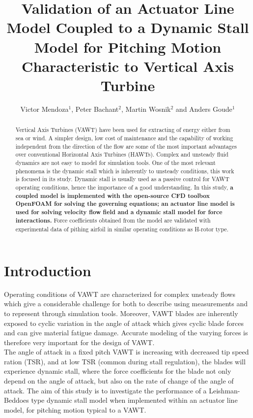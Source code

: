 \documentclass[a4paper]{jpconf}
\begin{document}
\title{Validation of an Actuator Line Model Coupled to a Dynamic Stall Model for Pitching Motion Characteristic to Vertical Axis Turbine} %
\author{Victor Mendoza$^{1}$, Peter Bachant$^{2}$, Martin Wosnik$^{2}$ and Anders Goude$^{1}$ }
\address{$^{1}$ Department of Engineering Sciences, Division of Electricity, Uppsala University, \\Uppsala 751 21, Sweden}
\address{$^{2}$ Center for Ocean Renewable Energy, University of New Hampshire, 24 Colovos Rd.,\\ Durham, NH 03824, USA}




\begin{abstract}

    Vertical Axis Turbines (VAWT) have been used for extracting of energy either
    from sea or wind. A simpler design, low cost of maintenance and the
    capability of working independent from the direction of the flow are some of
    the most important advantages over conventional Horizontal Axis Turbines
    (HAWTs). Complex and unsteady fluid dynamics are not easy to model for
    simulation tools. One of the most relevant phenomena is the dynamic stall
    which is inherently to unsteady conditions, this work is focused in its
    study. Dynamic stall is usually used as a passive control for VAWT operating
    conditions, hence the importance of a good understanding. In this study,
    \textbf{a coupled model is implemented with the open-source CFD toolbox
    OpenFOAM for solving the governing equations; an actuator line model is used
    for solving velocity flow field and a dynamic stall model for force
    interactions.} Force coefficients obtained from the model are validated with
    experimental data of pithing airfoil in similar operating conditions as
    H-rotor type. 

\end{abstract}



\section{Introduction}
Operating conditions of VAWT are characterized for complex unsteady flows which give a considerable challenge for both to describe using measurements and to represent through simulation tools\cite{huyer1996unsteady}. Moreover, VAWT blades are inherently exposed to cyclic variation in the angle of attack which gives cyclic blade forces and can give material fatigue damage. Accurate modeling of the varying forces is therefore very important for the design of VAWT.\\
The angle of attack in a fixed pitch VAWT is increasing with decreased tip speed ration (TSR), and at low TSR (common during stall regulation), the blades will experience dynamic stall, where the force coefficients for the blade not only depend on the angle of attack, but also on the rate of change of the angle of attack. The aim of this study is to investigate the performance of a Leishman-Beddoes type dynamic stall model when implemented within an actuator line model, for pitching motion typical to a VAWT.
\end{document}
